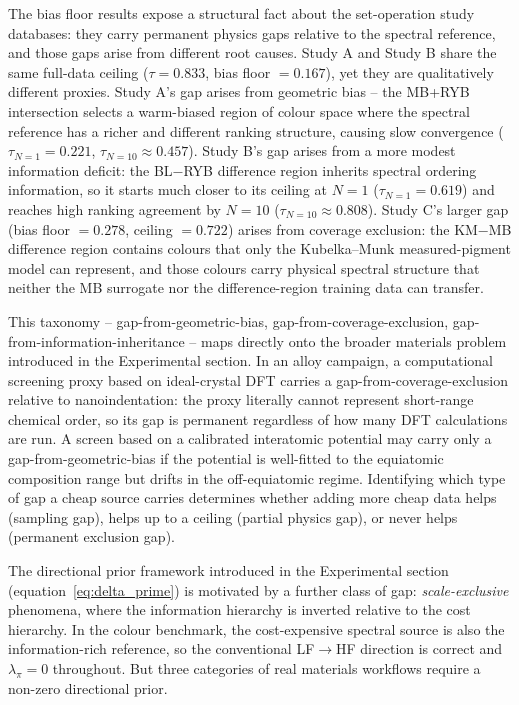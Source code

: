 \documentclass[twoside,twocolumn,9pt]{article}
\begin{document}
The bias floor results expose a structural fact about the set-operation study databases: they carry permanent physics gaps relative to the spectral reference, and those gaps arise from different root causes. Study A and Study B share the same full-data ceiling ($\tau = 0.833$, bias floor $= 0.167$), yet they are qualitatively different proxies. Study A's gap arises from geometric bias -- the MB+RYB intersection selects a warm-biased region of colour space where the spectral reference has a richer and different ranking structure, causing slow convergence ($\tau_{N=1} = 0.221$, $\tau_{N=10} \approx 0.457$). Study B's gap arises from a more modest information deficit: the BL$-$RYB difference region inherits spectral ordering information, so it starts much closer to its ceiling at $N=1$ ($\tau_{N=1} = 0.619$) and reaches high ranking agreement by $N=10$ ($\tau_{N=10} \approx 0.808$). Study C's larger gap (bias floor $= 0.278$, ceiling $= 0.722$) arises from coverage exclusion: the KM$-$MB difference region contains colours that only the Kubelka--Munk measured-pigment model can represent, and those colours carry physical spectral structure that neither the MB surrogate nor the difference-region training data can transfer.

This taxonomy -- gap-from-geometric-bias, gap-from-coverage-exclusion, gap-from-information-inheritance -- maps directly onto the broader materials problem introduced in the Experimental section. In an alloy campaign, a computational screening proxy based on ideal-crystal DFT carries a gap-from-coverage-exclusion relative to nanoindentation: the proxy literally cannot represent short-range chemical order, so its gap is permanent regardless of how many DFT calculations are run. A screen based on a calibrated interatomic potential may carry only a gap-from-geometric-bias if the potential is well-fitted to the equiatomic composition range but drifts in the off-equiatomic regime. Identifying which type of gap a cheap source carries determines whether adding more cheap data helps (sampling gap), helps up to a ceiling (partial physics gap), or never helps (permanent exclusion gap).

The directional prior framework introduced in the Experimental section (equation~\ref{eq:delta_prime}) is motivated by a further class of gap: \emph{scale-exclusive} phenomena, where the information hierarchy is inverted relative to the cost hierarchy. In the colour benchmark, the cost-expensive spectral source is also the information-rich reference, so the conventional LF$\to$HF direction is correct and $\lambda_\pi = 0$ throughout. But three categories of real materials workflows require a non-zero directional prior.
\end{document}
